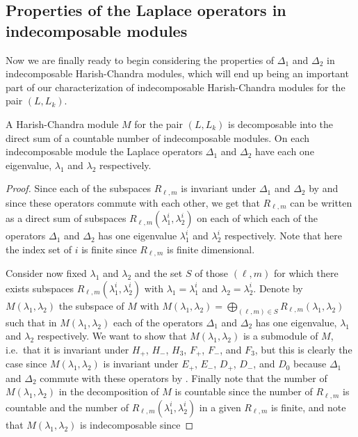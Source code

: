 \subsection{Properties of the Laplace operators in indecomposable modules}

Now we are finally ready to begin considering the properties of $\Delta_1$ and $\Delta_2$ in indecomposable Harish-Chandra modules, which will end up being an important part of our characterization of indecomposable Harish-Chandra modules for the pair $(L,L_k)$.

\begin{proposition}
  A Harish-Chandra module $M$ for the pair $(L,L_k)$ is decomposable into the direct sum of a countable number of indecomposable modules. On each indecomposable module the Laplace operators $\Delta_1$ and $\Delta_2$ have each one eigenvalue, $\lambda_1$ and $\lambda_2$ respectively.
\end{proposition}
\begin{proof}
  Since each of the subspaces $R_{\ell,m}$ is invariant under $\Delta_1$ and $\Delta_2$ by  and since these operators commute with each other, we get that $R_{\ell,m}$ can be written as a direct sum of subspaces $R_{\ell,m}(\lambda_1^{i},\lambda_2^{i})$ on each of which each of the operators $\Delta_1$ and $\Delta_2$ has one eigenvalue $\lambda_1^{i}$ and $\lambda_2^{i}$ respectively. Note that here the index set of $i$ is finite since $R_{\ell,m}$ is finite dimensional.

  Consider now fixed $\lambda_1$ and $\lambda_2$ and the set $S$ of those $(\ell,m)$ for which there exists subspaces $R_{\ell,m}(\lambda_1^{i},\lambda_2^{i})$ with $\lambda_1=\lambda_1^{i}$ and $\lambda_2=\lambda_2^{i}$. Denote by $M(\lambda_1,\lambda_2)$ the subspace of $M$ with $M(\lambda_1,\lambda_2)=\bigoplus_{(\ell,m)\in S} R_{\ell,m}(\lambda_1,\lambda_2)$ such that in $M(\lambda_1,\lambda_2)$ each of the operators $\Delta_1$ and $\Delta_2$ has one eigenvalue, $\lambda_1$ and $\lambda_2$ respectively. We want to show that $M(\lambda_1,\lambda_2)$ is a submodule of $M$, i.e.\ that it is invariant under $H_+$, $H_-$, $H_3$, $F_+$, $F_-$, and $F_3$, but this is clearly the case since $M(\lambda_1,\lambda_2)$ is invariant under $E_+$, $E_-$, $D_+$, $D_-$, and $D_0$ because $\Delta_1$ and $\Delta_2$ commute with these operators by . Finally note that the number of $M(\lambda_1,\lambda_2)$ in the decomposition of $M$ is countable since the number of $R_{\ell,m}$ is countable and the number of $R_{\ell,m}(\lambda_1^{i},\lambda_2^{i})$ in a given $R_{\ell,m}$ is finite, and note that $M(\lambda_1,\lambda_2)$ is indecomposable since 
\end{proof}

